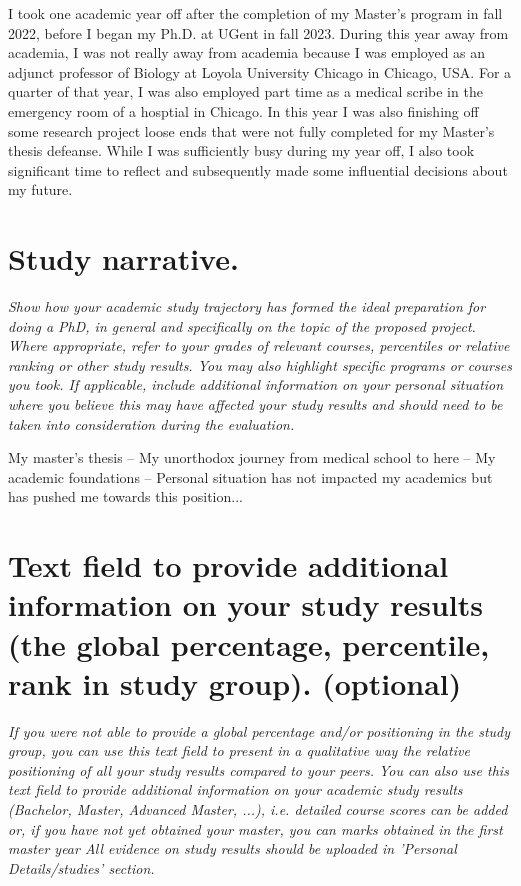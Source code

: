 {I took one academic year off after the completion of my Master's program in fall 2022, before I began my Ph.D. at UGent in fall 2023. 
During this year away from academia, I was not really away from academia because I was employed as an adjunct professor of Biology at Loyola University Chicago in Chicago, USA.
For a quarter of that year, I was also employed part time as a medical scribe in the emergency room of a hosptial in Chicago.
In this year I was also finishing off some research project loose ends that were not fully completed for my Master's thesis defeanse.
While I was sufficiently busy during my year off, I also took significant time to reflect and subsequently made some influential decisions about my future.

\section{Study narrative.}
\textit{
Show how your academic study trajectory has formed the ideal preparation for doing a PhD, in general and specifically on the topic of the proposed project. Where appropriate, refer to your grades of relevant courses, percentiles or relative ranking or other study results. You may also highlight specific programs or courses you took. If applicable, include additional information on your personal situation where you believe this may have affected your study results and should need to be taken into consideration during the evaluation.
}

My master's thesis --
My unorthodox journey from medical school to here --
My academic foundations -- 
Personal situation has not impacted my academics but has pushed me towards this position...


\section{Text field to provide additional information on your study results (the global percentage, percentile, rank in study group). (optional)}
\textit{
If you were not able to provide a global percentage and/or positioning in the study group, you can use this text field to present in a qualitative way the relative positioning of all your study results compared to your peers. You can also use this text field to provide additional information on your academic study results (Bachelor, Master, Advanced Master, ...), i.e. detailed course scores can be added or, if you have not yet obtained your master, you can marks obtained in the first master year All evidence on study results should be uploaded in 'Personal Details/studies' section.
}

}
